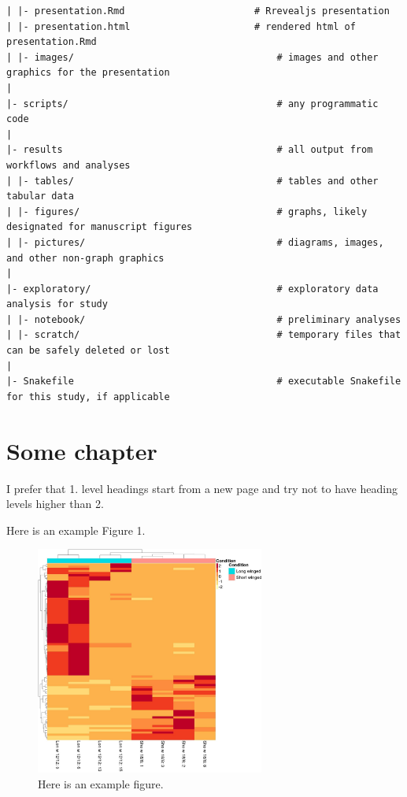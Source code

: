 \documentclass[
]{article}
\begin{document}
\begin{verbatim}
| |- presentation.Rmd                       # Rrevealjs presentation
| |- presentation.html                      # rendered html of presentation.Rmd
| |- images/                                    # images and other graphics for the presentation
|
|- scripts/                                     # any programmatic code
|
|- results                                      # all output from workflows and analyses
| |- tables/                                    # tables and other tabular data
| |- figures/                                   # graphs, likely designated for manuscript figures
| |- pictures/                                  # diagrams, images, and other non-graph graphics
|
|- exploratory/                                 # exploratory data analysis for study
| |- notebook/                                  # preliminary analyses
| |- scratch/                                   # temporary files that can be safely deleted or lost
|
|- Snakefile                                    # executable Snakefile for this study, if applicable
\end{verbatim}

\clearpage

\hypertarget{some-chapter}{%
\section{Some chapter}\label{some-chapter}}

I prefer that 1. level headings start from a new page and try not to have heading levels higher than 2.

Here is an example Figure 1.

\begin{figure}
\centering
\includegraphics[width=0.67\textwidth,height=\textheight]{../presentations/images/example.jpg}
\caption{Here is an example figure.}
\end{figure}
\end{document}
